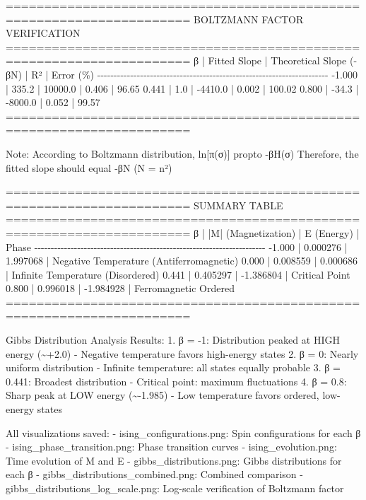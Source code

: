 \documentclass[11pt]{article}
\newenvironment{Shaded}{}{}
\newcommand{\NormalTok}[1]{{#1}}
\begin{document}
\begin{Shaded}
\begin{Highlighting}[]
\NormalTok{======================================================================}
\NormalTok{BOLTZMANN FACTOR VERIFICATION}
\NormalTok{======================================================================}
\NormalTok{       β |    Fitted Slope | Theoretical Slope ({-}βN) |         R² |  Error (\%)}
\NormalTok{{-}{-}{-}{-}{-}{-}{-}{-}{-}{-}{-}{-}{-}{-}{-}{-}{-}{-}{-}{-}{-}{-}{-}{-}{-}{-}{-}{-}{-}{-}{-}{-}{-}{-}{-}{-}{-}{-}{-}{-}{-}{-}{-}{-}{-}{-}{-}{-}{-}{-}{-}{-}{-}{-}{-}{-}{-}{-}{-}{-}{-}{-}{-}{-}{-}{-}{-}{-}{-}{-}}
\NormalTok{  {-}1.000 |           335.2 |              10000.0 |      0.406 |      96.65}
\NormalTok{   0.441 |             1.0 |              {-}4410.0 |      0.002 |     100.02}
\NormalTok{   0.800 |           {-}34.3 |              {-}8000.0 |      0.052 |      99.57}
\NormalTok{======================================================================}

\NormalTok{Note: According to Boltzmann distribution, ln[π(σ)] propto {-}βH(σ)}
\NormalTok{      Therefore, the fitted slope should equal {-}βN (N = n²)}

\NormalTok{======================================================================}
\NormalTok{SUMMARY TABLE}
\NormalTok{======================================================================}
\NormalTok{       β |  |M| (Magnetization) |           E (Energy) | Phase}
\NormalTok{{-}{-}{-}{-}{-}{-}{-}{-}{-}{-}{-}{-}{-}{-}{-}{-}{-}{-}{-}{-}{-}{-}{-}{-}{-}{-}{-}{-}{-}{-}{-}{-}{-}{-}{-}{-}{-}{-}{-}{-}{-}{-}{-}{-}{-}{-}{-}{-}{-}{-}{-}{-}{-}{-}{-}{-}{-}{-}{-}{-}{-}{-}{-}{-}{-}{-}{-}{-}{-}{-}}
\NormalTok{  {-}1.000 |             0.000276 |             1.997068 | Negative Temperature (Antiferromagnetic)}
\NormalTok{   0.000 |             0.008559 |             0.000686 | Infinite Temperature (Disordered)}
\NormalTok{   0.441 |             0.405297 |            {-}1.386804 | Critical Point}
\NormalTok{   0.800 |             0.996018 |            {-}1.984928 | Ferromagnetic Ordered}
\NormalTok{======================================================================}

\NormalTok{Gibbs Distribution Analysis Results:}
\NormalTok{1. β = {-}1: Distribution peaked at HIGH energy (\textasciitilde{}+2.0) {-} Negative temperature favors high{-}energy states}
\NormalTok{2. β = 0: Nearly uniform distribution {-} Infinite temperature: all states equally probable}
\NormalTok{3. β = 0.441: Broadest distribution {-} Critical point: maximum fluctuations}
\NormalTok{4. β = 0.8: Sharp peak at LOW energy (\textasciitilde{}{-}1.985) {-} Low temperature favors ordered, low{-}energy states}

\NormalTok{All visualizations saved:}
\NormalTok{  {-} ising\_configurations.png: Spin configurations for each β}
\NormalTok{  {-} ising\_phase\_transition.png: Phase transition curves}
\NormalTok{  {-} ising\_evolution.png: Time evolution of M and E}
\NormalTok{  {-} gibbs\_distributions.png: Gibbs distributions for each β}
\NormalTok{  {-} gibbs\_distributions\_combined.png: Combined comparison}
\NormalTok{  {-} gibbs\_distributions\_log\_scale.png: Log{-}scale verification of Boltzmann factor}
\end{Highlighting}
\end{Shaded}
\end{document}
